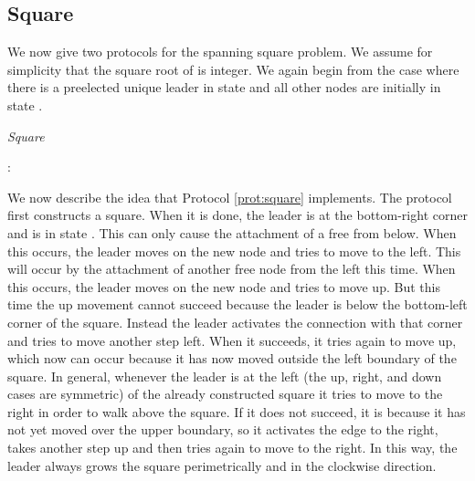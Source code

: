 \documentclass[oribibl, 11pt]{llncs}
\begin{document}
\subsection{ Square}
\label{subsec:stab-square}

We now give two protocols for the spanning square problem. We assume for simplicity that the square root of  is integer. We again begin from the case where there is a preelected unique leader in state  and all other nodes are initially in state .

\renewcommand{\algorithmiccomment}[1]{// #1}
\begin{algorithm}[!h]
  \caption{\emph{Square}}\label{prot:square}
  \begin{algorithmic}
    \medskip
    \State 
    \State : 
    
    \State {}
  \end{algorithmic}
\end{algorithm} 

We now describe the idea that Protocol \ref{prot:square} implements. The protocol first constructs a  square. When it is done, the leader is at the bottom-right corner and is in state . This can only cause the attachment of a free  from below. When this occurs, the leader moves on the new node and tries to move to the left. This will occur by the attachment of another free node from the left this time. When this occurs, the leader moves on the new node and tries to move up. But this time the up movement cannot succeed because the leader is below the bottom-left corner of the square. Instead the leader activates the connection with that corner and tries to move another step left. When it succeeds, it tries again to move up, which now can occur because it has now moved outside the left boundary of the  square. In general, whenever the leader is at the left (the up, right, and down cases are symmetric) of the already constructed square it tries to move to the right in order to walk above the square. If it does not succeed, it is because it has not yet moved over the upper boundary, so it activates the edge to the right, takes another step up and then tries again to move to the right. In this way, the leader always grows the square perimetrically and in the clockwise direction.
\end{document}
